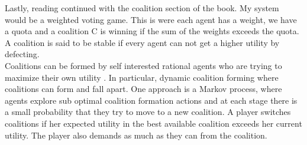 Lastly, reading continued with the coalition section of the book. My system would be a weighted voting game. This is were each agent has a weight, we have a quota and a coalition C is winning if the sum of the weights exceeds the quota. A coalition is said to be stable if every agent can not get a higher utility by defecting. \\
Coalitions can be formed by self interested rational agents who are trying to maximize their own utility \citep{Chalkiadakis:2012:pdflatex}. In particular, dynamic coalition forming where coalitions can form and fall apart. One approach is a Markov process, where agents explore sub optimal coalition formation actions and at each stage there is a small probability that they try to move to a new coalition. A player switches coalitions if her expected utility in the best available coalition exceeds her current utility. The player also demands as much as they can from the coalition.
